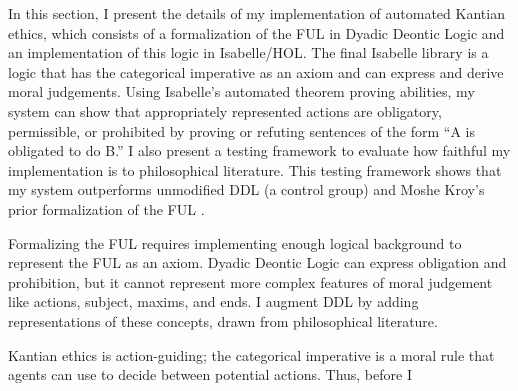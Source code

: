 %
\begin{isabellebody}%
%
%
\isadelimtheory
%
\endisadelimtheory
%
\isatagtheory
%
\endisatagtheory
{\isafoldtheory}%
%
\isadelimtheory
%
\endisadelimtheory
%
\isadelimdocument
%
\endisadelimdocument
%
\isatagdocument
%
\isamarkuptrue%
%
\endisatagdocument
{\isafolddocument}%
%
\isadelimdocument
%
\endisadelimdocument
%
\begin{isamarkuptext}%
In this section, I present the details of my implementation of automated Kantian ethics, which consists of
a formalization of the FUL in Dyadic Deontic Logic and an implementation of this logic in Isabelle/HOL. The final
Isabelle library is a logic that has the categorical imperative as an axiom and can express and derive moral judgements. 
Using Isabelle's automated theorem proving abilities, my system can show that appropriately represented
actions are obligatory, permissible, or prohibited by proving or refuting sentences of the form ``A 
is obligated to do B.'' I also present a testing framework to evaluate how faithful my implementation is 
to philosophical literature. This testing framework shows that my system outperforms unmodified DDL 
(a control group) and Moshe Kroy's prior formalization of the FUL \citep{kroy}.%
\end{isamarkuptext}\isamarkuptrue%
%
\isadelimdocument
%
\endisadelimdocument
%
\isatagdocument
%
\isamarkuptrue%
%
\endisatagdocument
{\isafolddocument}%
%
\isadelimdocument
%
\endisadelimdocument
%
\begin{isamarkuptext}%
Formalizing the FUL requires implementing enough logical background to represent 
the FUL as an axiom. Dyadic Deontic Logic can express obligation and prohibition, but it cannot 
represent more complex features of moral judgement like actions, subject, maxims, and ends. I augment 
DDL by adding representations of these concepts, drawn from philosophical literature.%
\end{isamarkuptext}\isamarkuptrue%
%
\isadelimdocument
%
\endisadelimdocument
%
\isatagdocument
%
\isamarkuptrue%
%
\endisatagdocument
{\isafolddocument}%
%
\isadelimdocument
%
\endisadelimdocument
%
\begin{isamarkuptext}%
Kantian ethics is action-guiding; the categorical
imperative is a moral rule that agents can use to decide between potential actions. Thus, before I 

\end{isamarkuptext}
\end{isabellebody}
